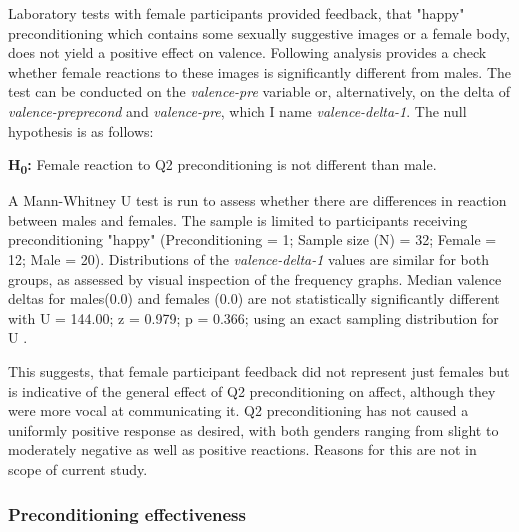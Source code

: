 		Laboratory tests with female participants provided feedback, that "happy" preconditioning which contains some sexually suggestive images or a female body, does not yield a positive effect on valence. Following analysis provides a check whether female reactions to these images is significantly different from males. The test can be conducted on the \textit{valence-pre} variable or, alternatively, on the delta of \textit{valence-preprecond} and \textit{valence-pre}, which I name \textit{valence-delta-1}. The null hypothesis is as follows:
		 
		\textbf{H\textsubscript{0}:} Female reaction to Q2 preconditioning is not different than male.
		
		A Mann-Whitney U test is run to assess whether there are differences in reaction between males and females. The sample is limited to participants receiving preconditioning "happy" (Preconditioning = 1; Sample size (N) = 32; Female = 12; Male = 20). Distributions of the \textit{valence-delta-1} values are similar for both groups, as assessed by visual inspection of the frequency graphs. Median valence deltas for males(0.0) and females (0.0) are not statistically significantly different with U = 144.00; z = 0.979; p = 0.366; using an exact sampling distribution for U \cite{Dinneen1973}.
		
		This suggests, that female participant feedback did not represent just females but is indicative of the general effect of Q2 preconditioning on affect, although they were more vocal at communicating it. Q2 preconditioning has not caused a uniformly positive response as desired, with both genders ranging from slight to moderately negative as well as positive reactions. 
		Reasons for this are not in scope of current study. %
		
		\subsubsection{Preconditioning effectiveness}
		
